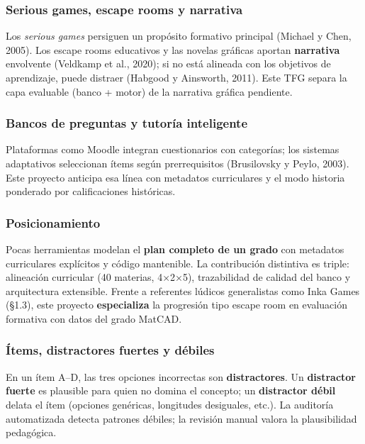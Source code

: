 \documentclass[11pt,a4paper]{article}
\begin{document}
\subsubsection{Serious games, escape rooms y narrativa}

Los \textit{serious games} persiguen un propósito formativo principal (Michael y Chen, 2005). Los escape rooms educativos y las novelas gráficas aportan \textbf{narrativa} envolvente (Veldkamp et al., 2020); si no está alineada con los objetivos de aprendizaje, puede distraer (Habgood y Ainsworth, 2011). Este TFG separa la capa evaluable (banco + motor) de la narrativa gráfica pendiente.

\subsubsection{Bancos de preguntas y tutoría inteligente}

Plataformas como Moodle integran cuestionarios con categorías; los sistemas adaptativos seleccionan ítems según prerrequisitos (Brusilovsky y Peylo, 2003). Este proyecto anticipa esa línea con metadatos curriculares y el modo historia ponderado por calificaciones históricas.

\subsubsection{Posicionamiento}

Pocas herramientas modelan el \textbf{plan completo de un grado} con metadatos curriculares explícitos y código mantenible. La contribución distintiva es triple: alineación curricular (40 materias, 4×2×5), trazabilidad de calidad del banco y arquitectura extensible. Frente a referentes lúdicos generalistas como Inka Games (§1.3), este proyecto \textbf{especializa} la progresión tipo escape room en evaluación formativa con datos del grado MatCAD.

\subsubsection{Ítems, distractores fuertes y débiles}

En un ítem A--D, las tres opciones incorrectas son \textbf{distractores}. Un \textbf{distractor fuerte} es plausible para quien no domina el concepto; un \textbf{distractor débil} delata el ítem (opciones genéricas, longitudes desiguales, etc.). La auditoría automatizada detecta patrones débiles; la revisión manual valora la plausibilidad pedagógica.
\end{document}
